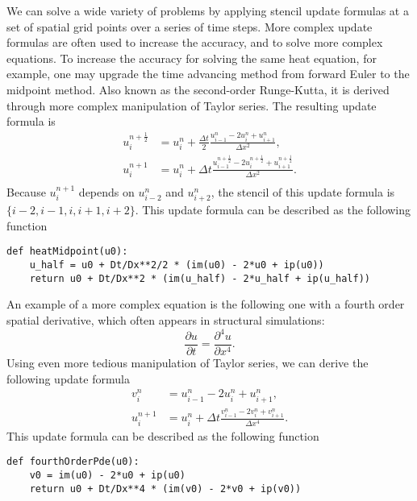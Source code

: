 \documentclass[review]{siamart0216}
\begin{document}
We can solve a wide variety of problems by applying stencil update formulas
at a set of spatial grid points over a series of time steps.
More complex update formulas are often used to increase the accuracy,
and to solve more complex equations.
To increase the accuracy for solving the same heat equation, for example, one
may upgrade the time advancing method from forward Euler to the midpoint
method.  Also known as the second-order Runge-Kutta, it is derived through more
complex manipulation of Taylor series.  The resulting update formula is
\begin{equation} \label{update01}
\begin{split}
u_i^{n+\frac12} &= u_i^n + \frac{\Delta t}2 \frac{u_{i-1}^n - 2 u_i^n + u_{i+1}^n}{\Delta x^2}, \\
u_i^{n+1} &= u_i^n + \Delta t \frac{u_{i-1}^{n+\frac12} - 2 u_i^{n+\frac12} + u_{i+1}^{n+\frac12}}{\Delta x^2}. \\
\end{split}
\end{equation}
Because $u_i^{n+1}$ depends on $u_{i-2}^n$ and $u_{i+2}^n$, the stencil of this update formula is $\{i-2,i-1,i,i+1,i+2\}$.
This update formula can be described as the following function
\begin{lstlisting}
def heatMidpoint(u0):
    u_half = u0 + Dt/Dx**2/2 * (im(u0) - 2*u0 + ip(u0))
    return u0 + Dt/Dx**2 * (im(u_half) - 2*u_half + ip(u_half))
\end{lstlisting}
An example of a more complex equation is the following one with a fourth order spatial derivative, which often appears in structural simulations:
\begin{equation}
\frac{\partial u}{\partial t} = \frac{\partial^4 u}{\partial x^4}.
\end{equation}
Using even more tedious manipulation of Taylor series, we can derive the following update formula
\begin{equation} \label{update02}
\begin{split}
v_i^n &= u_{i-1}^n - 2 u_i^n + u_{i+1}^n, \\
u_i^{n+1} &= u_i^n + \Delta t \frac{v_{i-1}^n - 2 v_i^n + v_{i+1}^n}{\Delta x^4}.
\end{split}
\end{equation}
This update formula can be described as the following function
\begin{lstlisting}
def fourthOrderPde(u0):
    v0 = im(u0) - 2*u0 + ip(u0)
    return u0 + Dt/Dx**4 * (im(v0) - 2*v0 + ip(v0))
\end{lstlisting}
\end{document}
